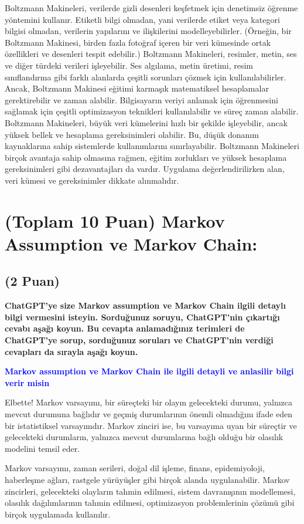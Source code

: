 \documentclass[11pt]{article}
\begin{document}
Boltzmann Makineleri, verilerde gizli desenleri keşfetmek için denetimsiz öğrenme yöntemini kullanır. Etiketli bilgi olmadan, yani verilerde etiket veya kategori bilgisi olmadan, verilerin yapılarını ve ilişkilerini modelleyebilirler. (Örneğin, bir Boltzmann Makinesi, birden fazla fotoğraf içeren bir veri kümesinde ortak özellikleri ve desenleri tespit edebilir.)
Boltzmann Makineleri, resimler, metin, ses ve diğer türdeki verileri işleyebilir. Ses algılama, metin üretimi, resim sınıflandırma gibi farklı alanlarda çeşitli sorunları çözmek için kullanılabilirler.
Ancak, Boltzmann Makinesi eğitimi karmaşık matematiksel hesaplamalar gerektirebilir ve zaman alabilir. Bilgisayarın veriyi anlamak için öğrenmesini sağlamak için çeşitli optimizasyon teknikleri kullanılabilir ve süreç zaman alabilir.
Boltzmann Makineleri, büyük veri kümelerini hızlı bir şekilde işleyebilir, ancak yüksek bellek ve hesaplama gereksinimleri olabilir. Bu, düşük donanım kaynaklarına sahip sistemlerde kullanımlarını sınırlayabilir.
Boltzmann Makineleri birçok avantaja sahip olmasına rağmen, eğitim zorlukları ve yüksek hesaplama gereksinimleri gibi dezavantajları da vardır. Uygulama değerlendirilirken alan, veri kümesi ve gereksinimler dikkate alınmalıdır.

\section{(Toplam 10 Puan) Markov Assumption ve Markov Chain:}

\subsection{(2 Puan)} \textbf{ChatGPT’ye size Markov assumption ve Markov Chain ilgili detaylı bilgi vermesini isteyin. Sorduğunuz soruyu, ChatGPT'nin çıkartığı cevabı aşağı koyun. Bu cevapta anlamadığınız terimleri de ChatGPT’ye sorup, sorduğunuz soruları ve ChatGPT’nin verdiği cevapları da sırayla aşağı koyun.}

\textbf{\textcolor{blue}{Markov assumption ve Markov Chain ile ilgili detayli ve anlasilir bilgi verir misin}}

Elbette! Markov varsayımı, bir süreçteki bir olayın gelecekteki durumu, yalnızca mevcut durumuna bağlıdır ve geçmiş durumlarının önemli olmadığını ifade eden bir istatistiksel varsayımdır. Markov zinciri ise, bu varsayıma uyan bir süreçtir ve gelecekteki durumların, yalnızca mevcut durumlarına bağlı olduğu bir olasılık modelini temsil eder.

Markov varsayımı, zaman serileri, doğal dil işleme, finans, epidemiyoloji, haberleşme ağları, rastgele yürüyüşler gibi birçok alanda uygulanabilir. Markov zincirleri, gelecekteki olayların tahmin edilmesi, sistem davranışının modellemesi, olasılık dağılımlarının tahmin edilmesi, optimizasyon problemlerinin çözümü gibi birçok uygulamada kullanılır.
\end{document}
